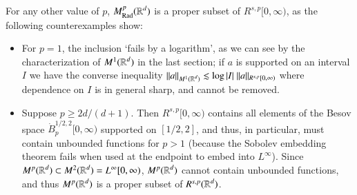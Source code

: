 For any other value of $p$, $M^p_{\text{Rad}}(\operatorname{\mathbb{R}}^d)$ is a proper subset of $R^{s,p}[0,\infty)$, as the following counterexamples show:
%
\begin{itemize}
  \item For $p = 1$, the inclusion `fails by a logarithm', as we can see by the characterization of $M^1(\operatorname{\mathbb{R}}^d)$ in the last section; if $a$ is supported on an interval $I$ we have the converse inequality $\| a \|_{M^1(\operatorname{\mathbb{R}}^d)} \lesssim \log |I|\; \| a \|_{R^{s,p}[0,\infty)}$ where dependence on $I$ is in general sharp, and cannot be removed.

  \item Suppose $p \geq 2d/(d+1)$. Then $R^{s,p}[0,\infty)$ contains all elements of the Besov space $\dot{B}^{{1/2},2}_p[0,\infty)$ supported on $[1/2,2]$, and thus, in particular, must contain unbounded functions for $p > 1$ (because the Sobolev embedding theorem fails when used at the endpoint to embed into $L^\infty$). Since $M^p(\operatorname{\mathbb{R}}^d) \subset M^2(\operatorname{\mathbb{R}}^d) = L^\infty[0,\infty)$, $M^p(\operatorname{\mathbb{R}}^d)$ cannot contain unbounded functions, and thus $M^p(\operatorname{\mathbb{R}}^d)$ is a proper subset of $R^{s,p}(\operatorname{\mathbb{R}}^d)$.








\end{itemize}
